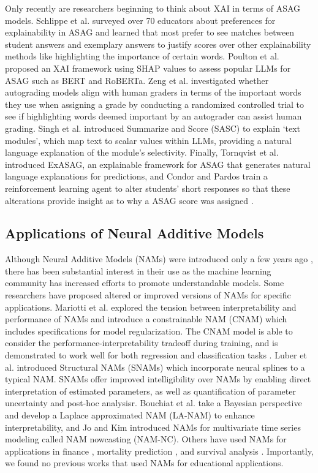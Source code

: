 Only recently are researchers beginning to think about XAI in terms of ASAG models. Schlippe et al. \cite{schlippe2022explainability} surveyed over 70 educators about preferences for explainability in ASAG and learned that most prefer to see matches between student answers and exemplary answers to justify scores over other explainability methods like highlighting the importance of certain words. Poulton et al. \cite{poulton2021explaining} proposed an XAI framework using SHAP values to assess popular LLMs for ASAG such as BERT and RoBERTa. Zeng et al. \cite{zeng2022deep} investigated whether autograding models align with human graders in terms of the important words they use when assigning a grade by conducting a randomized controlled trial to see if highlighting words deemed important by an autograder can assist human grading. Singh et al. \cite{singh2023explaining} introduced Summarize and Score (SASC) to explain ‘text modules’, which map text to scalar values within LLMs, providing a natural language explanation of the module’s selectivity. Finally, Tornqvist et al. \cite{tornqvist2023exasag} introduced ExASAG, an explainable framework for ASAG that generates natural language explanations for predictions, and Condor and Pardos train a reinforcement learning agent to alter students' short responses so that these alterations provide insight as to why a ASAG score was assigned \cite{condor2022deep}.

\subsection{Applications of Neural Additive Models}
Although Neural Additive Models (NAMs) were introduced only a few years ago \cite{agarwal2020neural}, there has been substantial interest in their use as the machine learning community has increased efforts to promote understandable models. Some researchers have proposed altered or improved versions of NAMs for specific applications. Mariotti et al. \cite{mariotti2023exploring} explored the tension between interpretability and performance of NAMs and introduce a constrainable NAM (CNAM) which includes specifications for model regularization. The CNAM model is able to consider the performance-interpretability tradeoff during training, and is demonstrated to work well for both regression and classification tasks \cite{mariotti2023exploring}. Luber et al. \cite{luber2023structural} introduced Structural NAMs (SNAMs) which incorporate neural splines to a typical NAM. SNAMs offer improved intelligibility over NAMs by enabling direct interpretation of estimated parameters, as well as quantification of parameter uncertainty and post-hoc analysisr. Bouchiat et al. \cite{bouchiat2023laplace} take a Bayesian perspective and develop a Laplace approximated NAM (LA-NAM) to enhance interpretability, and Jo and Kim \cite{jo2022neural} introduced NAMs for multivariate time series modeling called NAM nowcasting (NAM-NC). Others have used NAMs for applications in finance \cite{chen2022monotonic}, mortality prediction \cite{moslehi2022interpretable}, and survival analysis \cite{utkin2022extension}. Importantly, we found no previous works that used NAMs for educational applications.

